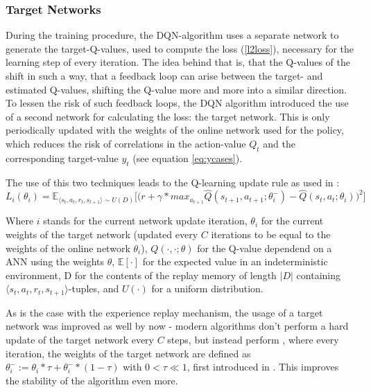 \subsubsection{Target Networks}
During the training procedure, the DQN-algorithm uses a separate network to generate the target-Q-values, used to compute the loss (\ref{l2loss}), necessary for the learning step of every iteration. The idea behind that is, that the Q-values of the  shift in such a way, that a feedback loop can arise between the target- and estimated Q-values, shifting the Q-value more and more into a similar direction. %
To lessen the risk of such feedback loops, the DQN algorithm introduced the use of a second network for calculating the loss: the target network. This is only periodically updated with the weights of the online network used for the policy, which reduces the risk of correlations in the action-value $Q_t$ and the corresponding target-value $y_t$ (see equation \ref{eq:ycases}).

The use of this two techniques leads to the Q-learning update rule as used in \cite{mnih_human-level_2015}:
\begin{equation}
	L_i(\theta_i) = \mathds{E}_{\langle s_t,a_t,r_t,s_{t+1} \rangle \sim U(D)} \Bigg[\Big( r + \gamma * max_{a_{t+1}} \hat{Q}(s_{t+1}, a_{t+1}; \theta^-_i) - \hat{Q}(s_t,a_t;\theta_i) \Big)^2\Bigg]
\end{equation}
\begin{flushright}
	\scriptsize
	Where $i$ stands for the current network update iteration, $\theta_i$ for the current weights of the target network (updated every $C$ iterations to be equal to the weights of the online network $\theta_i$), $Q(\cdot,\cdot;\theta)$ for the Q-value dependend on a ANN using the weights $\theta$, $\mathds{E}[\cdot]$ for the expected value in an indeterministic environment, D for the contents of the replay memory of length $\lvert D \rvert$ containing $\langle s_t,a_t,r_t,s_{t+1} \rangle$-tuples, and $U(\cdot)$ for a uniform distribution.
\end{flushright}
As is the case with the experience replay mechanism, the usage of a target network was improved as well by now - modern algorithms don't perform a hard update of the target network every $C$ steps, but instead perform , where every iteration, the weights of the target network are defined as $\theta^-_i := \theta_i * \tau + \theta^-_i * (1-\tau)$ with $0 < \tau \ll 1$, first introduced in \cite{lillicrap_continuous_2015}. This improves the stability of the algorithm even more.\\

